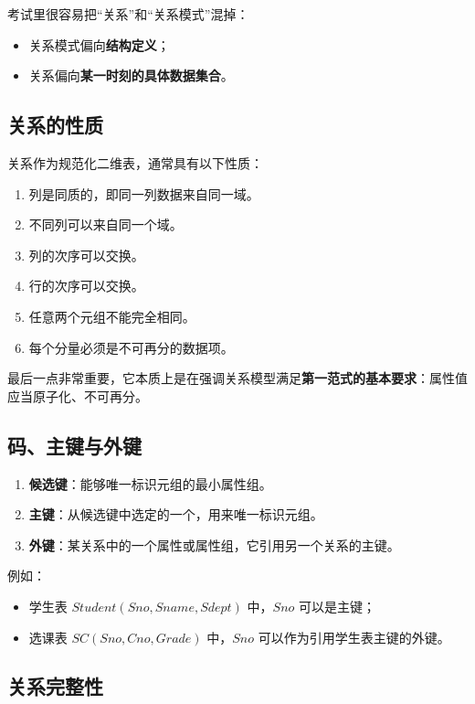 \documentclass{../../note}
\begin{document}
考试里很容易把“关系”和“关系模式”混掉：

\begin{itemize}
  \item 关系模式偏向\textbf{结构定义}；
  \item 关系偏向\textbf{某一时刻的具体数据集合}。
\end{itemize}

\subsection{关系的性质}

关系作为规范化二维表，通常具有以下性质：

\begin{enumerate}
  \item 列是同质的，即同一列数据来自同一域。
  \item 不同列可以来自同一个域。
  \item 列的次序可以交换。
  \item 行的次序可以交换。
  \item 任意两个元组不能完全相同。
  \item 每个分量必须是不可再分的数据项。
\end{enumerate}

最后一点非常重要，它本质上是在强调关系模型满足\textbf{第一范式的基本要求}：属性值应当原子化、不可再分。

\subsection{码、主键与外键}

\begin{enumerate}
  \item \textbf{候选键}：能够唯一标识元组的最小属性组。
  \item \textbf{主键}：从候选键中选定的一个，用来唯一标识元组。
  \item \textbf{外键}：某关系中的一个属性或属性组，它引用另一个关系的主键。
\end{enumerate}

例如：

\begin{itemize}
  \item 学生表 $Student(Sno, Sname, Sdept)$ 中，$Sno$ 可以是主键；
  \item 选课表 $SC(Sno, Cno, Grade)$ 中，$Sno$ 可以作为引用学生表主键的外键。
\end{itemize}

\subsection{关系完整性}
\end{document}
